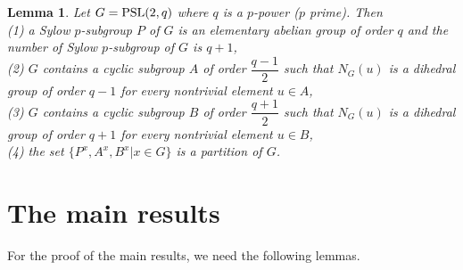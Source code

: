 \documentclass[12pt]{amsart}
\newtheorem{lemma}[theorem]{Lemma}
\theoremstyle{definition}
\begin{document}
\begin{lemma}\cite{huppert} \label{huppert}
	Let $ G ={\rm PSL}(2, q) $ where $ q $ is a $p$-power ($ p $ prime). Then\\
	(1) a Sylow $ p $-subgroup $ P $ of $ G $ is an elementary abelian group of
	order $ q $ and the number of Sylow $ p $-subgroup of $ G $ is $ q + 1 $,\\
	(2) $ G $ contains a cyclic subgroup $ A $ of order $\dfrac{q-1}{2}  $ such that $ N_G(u) $
	is a dihedral group of order $ q - 1 $ for every nontrivial element
	$ u \in A $,\\
	(3) $ G $ contains a cyclic subgroup $ B $ of order $ \dfrac{q+1}{2} $ such that $ N_G(u) $
	is a dihedral group of order $ q + 1 $ for every nontrivial element
	$ u \in B $,\\
	(4) the set $ \{ P^x, A^x, B^x | x \in G \} $ is a partition of $ G $.
\end{lemma}
	\section{\bf The main results}
	For the proof of the main results, we need the following lemmas.
	
\end{document}

